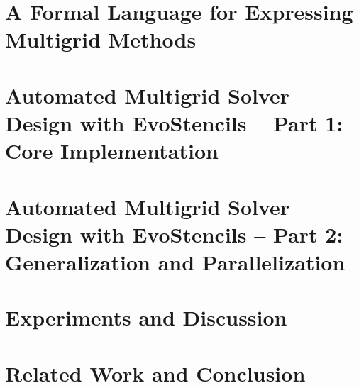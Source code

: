 \documentclass[
  paper = a5paper,
  language = english,
  acronym = nosymbol,
  acronymline = novertical,
  bibliography = combined,
  bibliographypart = all,
  titlesize = Huge,
  par = halfskip,
]{faupress}
\theoremstyle{definition}
\numberwithin{equation}{chapter}
\begin{document}
\chapter{A Formal Language for Expressing Multigrid Methods}
\label{chapter:multigrid-formal-language}
  
\chapter{Automated Multigrid Solver Design with EvoStencils -- Part 1: Core Implementation}
\label{chapter:evostencils-1}
  
\chapter{Automated Multigrid Solver Design with EvoStencils -- Part 2: Generalization and Parallelization}
  \label{chapter:evostencils-2}
  
\chapter{Experiments and Discussion}
\label{chapter:experiments}
  
\chapter{Related Work and Conclusion}
  
  

\appendix 


\backmatter
  \faupressprintbibliography
   \faupressprintacronyms
  \begingroup
  \listofalgorithms
  \let\clearpage\relax
  \listoflistings
  \endgroup
\end{document}
